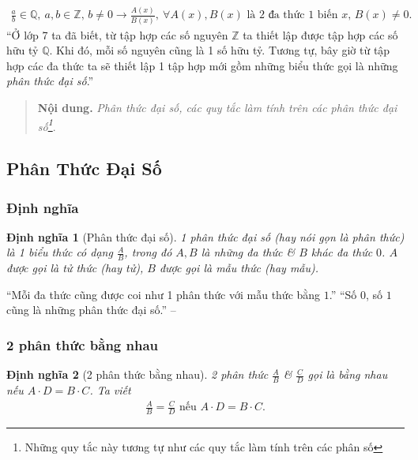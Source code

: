 \documentclass{article}
\numberwithin{equation}{section}
\newtheorem{dinhnghia}{Định nghĩa}[section]
\begin{document}
\begin{align*}
	\frac{a}{b}\in\mathbb{Q},\ a,b\in\mathbb{Z},\,b\ne 0\longrightarrow\frac{A(x)}{B(x)},\ \forall A(x),B(x)\mbox{ là 2 đa thức 1 biến } x,\,B(x)\ne 0.
\end{align*}
``Ở lớp 7 ta đã biết, từ tập hợp các số nguyên $\mathbb{Z}$ ta thiết lập được tập hợp các số hữu tỷ $\mathbb{Q}$. Khi đó, mỗi số nguyên cũng là 1 số hữu tỷ. Tương tự, bây giờ từ tập hợp các đa thức ta sẽ thiết lập 1 tập hợp mới gồm những biểu thức gọi là những \textit{phân  thức đại số}.''

\begin{quotation}
	\textbf{Nội dung.} \textit{Phân thức đại số, các quy tắc làm tính trên các phân thức đại số\footnote{Những quy tắc này tương tự như các quy tắc làm tính trên các phân số}}.
\end{quotation}

\subsection{Phân Thức Đại Số}

\subsubsection{Định nghĩa}

\begin{dinhnghia}[Phân thức đại số]
	\emph{1 phân thức đại số} (hay nói gọn là \emph{phân thức}) là 1 biểu thức có dạng $\frac{A}{B}$, trong đó $A,B$ là những đa thức \& $B$ khác đa thức $0$. $A$ được gọi là \emph{tử thức} (hay \emph{tử}), $B$ được gọi là \emph{mẫu thức} (hay \emph{mẫu}).
\end{dinhnghia}
``Mỗi đa thức cũng được coi như 1 phân thức với mẫu thức bằng $1$.'' ``Số $0$, số $1$ cũng là những phân thức đại số.'' -- \cite[p. 35]{SGK_Toan_8_tap_1}

\subsubsection{2 phân thức bằng nhau}

\begin{dinhnghia}[2 phân thức bằng nhau]
	2 phân thức $\frac{A}{B}$ \& $\frac{C}{D}$ gọi là \emph{bằng nhau} nếu $A\cdot D = B\cdot C$. Ta viết
	\begin{align*}
		\frac{A}{B} = \frac{C}{D}\mbox{ nếu } A\cdot D = B\cdot C.
	\end{align*}
\end{dinhnghia}
\end{document}
